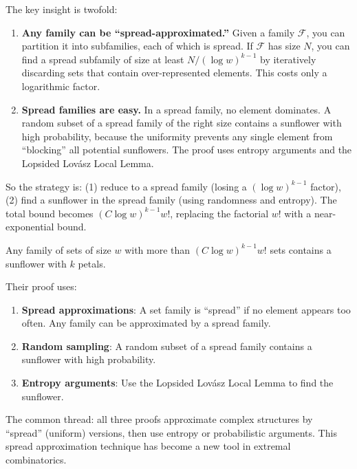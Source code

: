 The key insight is twofold:

\begin{enumerate}
\item \textbf{Any family can be ``spread-approximated.''} Given a family $\mathcal{F}$, you can partition it into subfamilies, each of which is spread. If $\mathcal{F}$ has size $N$, you can find a spread subfamily of size at least $N / (\log w)^{k-1}$ by iteratively discarding sets that contain over-represented elements. This costs only a logarithmic factor.
\item \textbf{Spread families are easy.} In a spread family, no element dominates. A random subset of a spread family of the right size contains a sunflower with high probability, because the uniformity prevents any single element from ``blocking'' all potential sunflowers. The proof uses entropy arguments and the Lopsided Lov\'{a}sz Local Lemma.
\end{enumerate}

So the strategy is: (1) reduce to a spread family (losing a $(\log w)^{k-1}$ factor), (2) find a sunflower in the spread family (using randomness and entropy). The total bound becomes $(C \log w)^{k-1} w!$, replacing the factorial $w!$ with a near-exponential bound.

\begin{theorem}
Any family of sets of size $w$ with more than $(C \log w)^{k-1} w!$ sets contains a sunflower with $k$ petals.
\end{theorem}

Their proof uses:
\begin{enumerate}
\item \textbf{Spread approximations}: A set family is ``spread'' if no element appears too often. Any family can be approximated by a spread family.
\item \textbf{Random sampling}: A random subset of a spread family contains a sunflower with high probability.
\item \textbf{Entropy arguments}: Use the Lopsided Lov\'{a}sz Local Lemma to find the sunflower.
\end{enumerate}

\begin{highlightbox}
The common thread: all three proofs approximate complex structures by ``spread'' (uniform) versions, then use entropy or probabilistic arguments. This spread approximation technique has become a new tool in extremal combinatorics.
\end{highlightbox}


